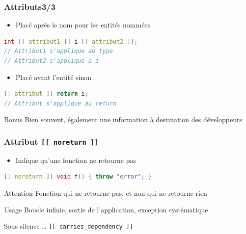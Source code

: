 \documentclass[C++.tex]{subfiles}
\begin{document}
\begin{frame}[fragile]
	\frametitle{Attributs\titlehfill{}3/3}
	\begin{itemize}
		\item Placé après le nom pour les entités nommées
	\end{itemize}

	\begin{lstlisting}[language=C++]
int [[ attribut1 ]] i [[ attribut2 ]];
// Attribut1 s'applique au type
// Attribut2 s'applique a i\end{lstlisting}

	\begin{itemize}
		\item Placé avant l'entité sinon
	\end{itemize}

	\begin{lstlisting}[language=C++]
[[ attribut ]] return i;
// Attribut s'applique au return\end{lstlisting}

	\begin{exampleblock}{Bonus}
		Bien souvent, également une information à destination des développeurs
	\end{exampleblock}
\end{frame}

\begin{frame}[fragile]
	\frametitle{Attribut \lstinline|[[ noreturn ]]|}
	\begin{itemize}
		\item Indique qu'une fonction ne retourne pas
	\end{itemize}

	\begin{lstlisting}[language=C++]
[[ noreturn ]] void f() { throw "error"; }\end{lstlisting}

	\begin{alertblock}{Attention}
		Fonction qui ne retourne pas, et non qui ne retourne rien
	\end{alertblock}

	\begin{block}{Usage}
		Boucle infinie, sortie de l'application, exception systématique
	\end{block}

	\begin{block}{Sous silence \ldots}
		\lstinline|[[ carries_dependency ]]| 
	
	\end{block}
\end{frame}
\end{document}
